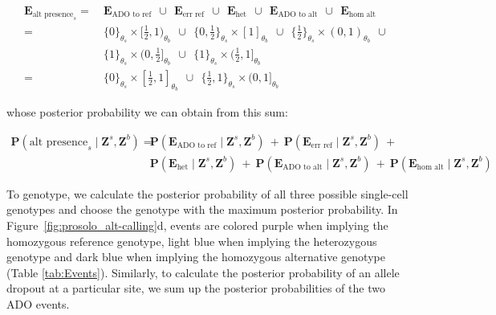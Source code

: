 \documentclass[12pt,inline]{wlscirep}
\newcommand{\Prob}{{\mathbf{P}}}
\begin{document}
\begin{equation}
 \label{eq:compound-event-alt-presence}
 \begin{split}
  \boldsymbol{E}_{\text{alt presence}_s}
  =~&\boldsymbol{E}_\text{ADO to ref}~~\cup~~
    \boldsymbol{E}_\text{err ref}~~\cup~~
    \boldsymbol{E}_\text{het}~~\cup~~
    \boldsymbol{E}_\text{ADO to alt}~~\cup~~
    \boldsymbol{E}_\text{hom alt} \\
  =~&\{0\}_{\theta_s} \times [\frac{1}{2}, 1)_{\theta_b}~~\cup~~
    \{0, \frac{1}{2}\}_{\theta_s} \times [1]_{\theta_b}~~\cup~~
    \{\frac{1}{2}\}_{\theta_s} \times (0,1)_{\theta_b}~~\cup~~\\
    &\{1\}_{\theta_s} \times (0,\frac{1}{2}]_{\theta_b}~~\cup~~
    \{1\}_{\theta_s} \times (\frac{1}{2},1]_{\theta_b} \\
  =~&\{0\}_{\theta_s} \times [\frac{1}{2},1]_{\theta_b}~~\cup~~
    \{\frac{1}{2},1\}_{\theta_s} \times (0,1]_{\theta_b}
 \end{split}
\end{equation}

whose posterior probability we can obtain from this sum:

\begin{equation}
 \label{eq:alt-posterior-prob}
 \begin{split}
  \Prob(\text{alt presence}_s \mid \boldsymbol{Z}^s,\boldsymbol{Z}^b) =~&
    \Prob(\boldsymbol{E}_{\text{ADO to ref}} \mid \boldsymbol{Z}^s,\boldsymbol{Z}^b)~+~ 
    \Prob(\boldsymbol{E}_{\text{err ref}} \mid \boldsymbol{Z}^s,\boldsymbol{Z}^b)~+ \\
  &\Prob(\boldsymbol{E}_{\text{het}} \mid \boldsymbol{Z}^s,\boldsymbol{Z}^b)~+~
  \Prob(\boldsymbol{E}_{\text{ADO to alt}} \mid \boldsymbol{Z}^s,\boldsymbol{Z}^b)~+~
  \Prob(\boldsymbol{E}_{\text{hom alt}} \mid \boldsymbol{Z}^s,\boldsymbol{Z}^b)
 \end{split}
\end{equation}

To genotype, we calculate the posterior probability of all three possible single-cell genotypes and choose the genotype with the maximum posterior probability. 
In Figure~\ref{fig:prosolo_alt-calling}d, events are colored purple when implying the homozygous reference genotype, light blue when implying the heterozygous genotype and dark blue when implying the homozygous alternative genotype (Table \ref{tab:Events}).
Similarly, to calculate the posterior probability of an allele dropout at a particular site, we sum up the posterior probabilities of the two {\ttfamily ADO} events.
\end{document}
